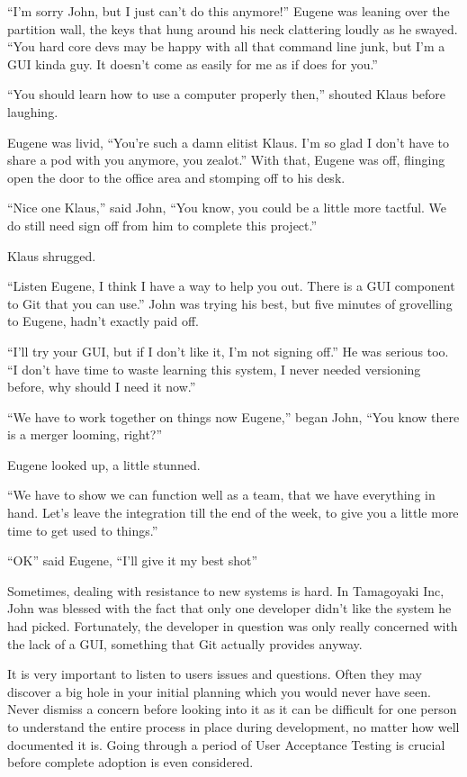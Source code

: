 \begin{trenches}
``I'm sorry John, but I just can't do this anymore!''
Eugene was leaning over the partition wall, the keys that hung around his neck clattering loudly as he swayed.
``You hard core devs may be happy with all that command line junk, but I'm a GUI kinda guy. It doesn't come as easily for me as if does for you.''

``You should learn how to use a computer properly then,'' shouted Klaus before laughing.

Eugene was livid, ``You're such a damn elitist Klaus. I'm so glad I don't have to share a pod with you anymore, you zealot.''
With that, Eugene was off, flinging open the door to the office area and stomping off to his desk.

``Nice one Klaus,'' said John,
``You know, you could be a little more tactful. We do still need sign off from him to complete this project.''

Klaus shrugged.

\thoughtbreak

``Listen Eugene, I think I have a way to help you out. There is a GUI component to Git that you can use.''
John was trying his best, but five minutes of grovelling to Eugene, hadn't exactly paid off.

``I'll try your GUI, but if I don't like it, I'm not signing off.''
He was serious too.
``I don't have time to waste learning this system, I never needed versioning before, why should I need it now.''

``We have to work together on things now Eugene,'' began John,
``You know there is a merger looming, right?''

Eugene looked up, a little stunned.

``We have to show we can function well as a team, that we have everything in hand. Let's leave the integration till the end of the week, to give you a little more time to get used to things.''

``OK'' said Eugene,
``I'll give it my best shot''
\end{trenches}

Sometimes, dealing with resistance to new systems is hard.
In Tamagoyaki Inc, John was blessed with the fact that only one developer didn't like the system he had picked.
Fortunately, the developer in question was only really concerned with the lack of a GUI, something that Git actually provides anyway.

It is very important to listen to users issues and questions.
Often they may discover a big hole in your initial planning which you would never have seen.
Never dismiss a concern before looking into it as it can be difficult for one person to understand the entire process in place during development, no matter how well documented it is.
Going through a period of User Acceptance Testing is crucial before complete adoption is even considered.

